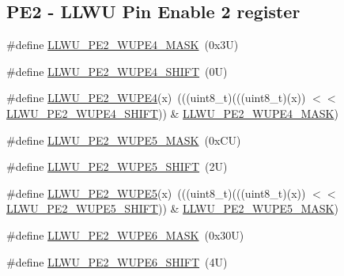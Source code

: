 \subsection*{P\+E2 -\/ L\+L\+WU Pin Enable 2 register}
\begin{DoxyCompactItemize}
\item 
\#define \mbox{\hyperlink{group___l_l_w_u___register___masks_ga94128d26c60f13d22acf47200f4f37e0}{L\+L\+W\+U\+\_\+\+P\+E2\+\_\+\+W\+U\+P\+E4\+\_\+\+M\+A\+SK}}~(0x3\+U)
\item 
\#define \mbox{\hyperlink{group___l_l_w_u___register___masks_ga12aa6ffb998e5273a8dd548ac434ad41}{L\+L\+W\+U\+\_\+\+P\+E2\+\_\+\+W\+U\+P\+E4\+\_\+\+S\+H\+I\+FT}}~(0\+U)
\item 
\#define \mbox{\hyperlink{group___l_l_w_u___register___masks_gadd7ab2866ab9683237ee5d6c003cf2aa}{L\+L\+W\+U\+\_\+\+P\+E2\+\_\+\+W\+U\+P\+E4}}(x)~(((uint8\+\_\+t)(((uint8\+\_\+t)(x)) $<$$<$ \mbox{\hyperlink{group___l_l_w_u___register___masks_ga12aa6ffb998e5273a8dd548ac434ad41}{L\+L\+W\+U\+\_\+\+P\+E2\+\_\+\+W\+U\+P\+E4\+\_\+\+S\+H\+I\+FT}})) \& \mbox{\hyperlink{group___l_l_w_u___register___masks_ga94128d26c60f13d22acf47200f4f37e0}{L\+L\+W\+U\+\_\+\+P\+E2\+\_\+\+W\+U\+P\+E4\+\_\+\+M\+A\+SK}})
\item 
\#define \mbox{\hyperlink{group___l_l_w_u___register___masks_gacfb855231e7a1c11c64d8b4e951817be}{L\+L\+W\+U\+\_\+\+P\+E2\+\_\+\+W\+U\+P\+E5\+\_\+\+M\+A\+SK}}~(0x\+C\+U)
\item 
\#define \mbox{\hyperlink{group___l_l_w_u___register___masks_ga4e823ada9bfc21dca4729eedf4e63778}{L\+L\+W\+U\+\_\+\+P\+E2\+\_\+\+W\+U\+P\+E5\+\_\+\+S\+H\+I\+FT}}~(2\+U)
\item 
\#define \mbox{\hyperlink{group___l_l_w_u___register___masks_ga956b7d4a8e1a041de809612c0cad83e3}{L\+L\+W\+U\+\_\+\+P\+E2\+\_\+\+W\+U\+P\+E5}}(x)~(((uint8\+\_\+t)(((uint8\+\_\+t)(x)) $<$$<$ \mbox{\hyperlink{group___l_l_w_u___register___masks_ga4e823ada9bfc21dca4729eedf4e63778}{L\+L\+W\+U\+\_\+\+P\+E2\+\_\+\+W\+U\+P\+E5\+\_\+\+S\+H\+I\+FT}})) \& \mbox{\hyperlink{group___l_l_w_u___register___masks_gacfb855231e7a1c11c64d8b4e951817be}{L\+L\+W\+U\+\_\+\+P\+E2\+\_\+\+W\+U\+P\+E5\+\_\+\+M\+A\+SK}})
\item 
\#define \mbox{\hyperlink{group___l_l_w_u___register___masks_ga0db50e96153e1ca74874da97d1c22f41}{L\+L\+W\+U\+\_\+\+P\+E2\+\_\+\+W\+U\+P\+E6\+\_\+\+M\+A\+SK}}~(0x30\+U)
\item 
\#define \mbox{\hyperlink{group___l_l_w_u___register___masks_gaa7a0191eaf60166333a8bee953239c85}{L\+L\+W\+U\+\_\+\+P\+E2\+\_\+\+W\+U\+P\+E6\+\_\+\+S\+H\+I\+FT}}~(4\+U)

\end{DoxyCompactItemize}
